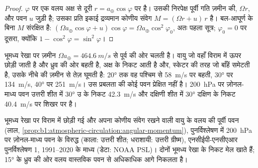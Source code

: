 \begin{proof}
 $\varphi$ पर एक वलय अक्ष से दूरी $r = a_\oplus\cos\varphi$ पर है। उसकी निरपेक्ष पूर्वी गति ज़मीन की, $\Omega r$, और पवन $u$ जुड़ी है; उसका प्रति इकाई द्रव्यमान कोणीय संवेग $M = (\Omega r + u)\,r$ है। बल-आघूर्ण के बिना $M$ संरक्षित है: $(\Omega a_\oplus\cos\varphi + u)\cos\varphi = \Omega a_\oplus
\cos^2\varphi_0$, अतः पहला सूत्र; $\varphi_0 = 0$ पर दूसरा, क्योंकि $1 - \cos^2\varphi = \sin^2\varphi$।
\end{proof}

भूमध्य रेखा पर ज़मीन $\Omega a_\oplus = \qty{464.6}{m/s}$ से पूर्व की ओर चलती है। वायु जो वहाँ विराम में ऊपर छोड़ी जाती है और ध्रुव की ओर बहती है, अक्ष के निकट आती है और, स्केटर की तरह जो बाँहें समेटती है, उसके नीचे की ज़मीन से तेज़ घूमती है: \ang{20} तक वह पश्चिम से \qty{58}{m/s} पर बहती, \ang{30} पर \qty{134}{m/s}, \ang{40} पर \qty{251}{m/s}। उस प्रबलता की कोई पवन प्रेक्षित नहीं है। \qty{200}{hPa} पर ज़ोनल-माध्य पवन उत्तरी शीत में \ang{30} उ के निकट \qty{42.3}{m/s} और दक्षिणी शीत में \ang{30} दक्षिण के निकट \qty{40.4}{m/s} पर शिखर पर है।

\begin{omfigure}

{\small भूमध्य रेखा पर विराम में छोड़ी गई और अपना कोणीय संवेग रखने वाली वायु के वलय की पूर्वी पवन (लाल, \cref{prop:b1:atmospheric-circulation:angular-momentum}), पुनर्विश्लेषण में \qty{200}{hPa} पर ज़ोनल-माध्य पवन के विरुद्ध (काला: उत्तरी शीत; धराशायी: उत्तरी ग्रीष्म), एनसीईपी-एनसीएआर पुनर्विश्लेषण 1, 1991--2020 के माध्य (डेटा: NOAA PSL)। दोनों भूमध्य रेखा के निकट मेल खाते हैं; \ang{15} के ध्रुव की ओर वलय वास्तविक पवन से अधिकाधिक आगे निकलता है।}
\label{fig:b1:atmospheric-circulation:angular-momentum}
\end{omfigure}

